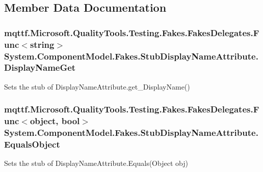 \subsection{Member Data Documentation}
\hypertarget{class_system_1_1_component_model_1_1_fakes_1_1_stub_display_name_attribute_a5f9f41455af8d1c18dab7a5b4b0224ba}{
\subsubsection[{Display\-Name\-Get}]{\setlength{\rightskip}{0pt plus 5cm}mqttf.\-Microsoft.\-Quality\-Tools.\-Testing.\-Fakes.\-Fakes\-Delegates.\-Func$<$string$>$ System.\-Component\-Model.\-Fakes.\-Stub\-Display\-Name\-Attribute.\-Display\-Name\-Get}}\label{class_system_1_1_component_model_1_1_fakes_1_1_stub_display_name_attribute_a5f9f41455af8d1c18dab7a5b4b0224ba}


Sets the stub of Display\-Name\-Attribute.\-get\-\_\-\-Display\-Name()

\hypertarget{class_system_1_1_component_model_1_1_fakes_1_1_stub_display_name_attribute_aace7daba511464f55ba96b1b59ac8fd6}{
\subsubsection[{Equals\-Object}]{\setlength{\rightskip}{0pt plus 5cm}mqttf.\-Microsoft.\-Quality\-Tools.\-Testing.\-Fakes.\-Fakes\-Delegates.\-Func$<$object, bool$>$ System.\-Component\-Model.\-Fakes.\-Stub\-Display\-Name\-Attribute.\-Equals\-Object}}\label{class_system_1_1_component_model_1_1_fakes_1_1_stub_display_name_attribute_aace7daba511464f55ba96b1b59ac8fd6}


Sets the stub of Display\-Name\-Attribute.\-Equals(\-Object obj)

